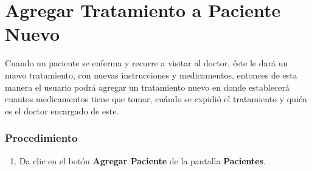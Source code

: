 \section{Agregar Tratamiento a Paciente Nuevo}

Cuando un paciente se enferma y recurre a visitar al doctor, éste le dará un nuevo tratamiento, con nuevas instrucciones y medicamentos, entonces de esta manera el usuario podrá agregar un tratamiento nuevo en donde establecerá cuantos medicamentos tiene que tomar, cuándo se expidió el tratamiento y quién es el doctor encargado de este.

\subsubsection{Procedimiento}
\begin{enumerate}
	
	\item Da clic en el botón \textbf{Agregar Paciente} de la pantalla \textbf{Pacientes}.
	

\end{enumerate}
